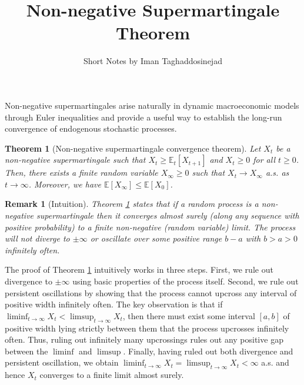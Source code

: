 \documentclass[12pt]{article}
\title{Non-negative Supermartingale Theorem}
\author{Short Notes by Iman Taghaddosinejad}
\newtheorem{theorem}{Theorem}
\newtheorem{remark}{Remark}
\begin{document}
\maketitle
Non-negative supermartingales arise naturally in dynamic macroeconomic models through 
Euler inequalities and provide a useful way to establish the long-run convergence of 
endogenous stochastic processes.

\begin{theorem}[Non-negative supermartingale convergence theorem]\label{thm:nonnegsupermartingale}
Let $X_t$ be a non-negative supermartingale such that $X_t\geq\mathbb{E}_t[X_{t+1}]$
and $X_t\geq0$ for all $t\geq0$. Then, there exists a finite random variable 
$X_\infty\geq0$ such that $X_t\to X_\infty$ a.s. as $t\to\infty$. Moreover, we have 
$\mathbb{E}[X_\infty]\leq \mathbb{E}[X_0]$.
\end{theorem}

\begin{remark}[Intuition]
Theorem \ref{thm:nonnegsupermartingale} states that if a random process is a 
non-negative supermartingale then it converges almost surely (along any sequence with positive
probability) to a finite non-negative (random variable) limit. The process will not diverge 
to $\pm\infty$ or oscillate over some positive range $b-a$ with $b>a>0$ infinitely 
often. 
\end{remark}
The proof of Theorem \ref{thm:nonnegsupermartingale} intuitively works in three steps. 
First, we rule out divergence to $\pm\infty$ using basic properties of the process itself. 
Second, we rule out persistent oscillations by showing that the process cannot upcross any 
interval of positive width infinitely often. The key observation is that if
$\liminf_{t\to\infty}X_t<\limsup_{t\to\infty}X_t$, then there must exist some interval 
$[a,b]$ of positive width lying strictly between them that the process upcrosses infinitely often. 
Thus, ruling out infinitely many upcrossings rules out any positive gap between the 
$\liminf$ and $\limsup$. Finally, having ruled out both divergence and persistent oscillation, 
we obtain $\liminf_{t\to\infty}X_t=\limsup_{t\to\infty}X_t <\infty$ a.s. and hence 
$X_t$ converges to a finite limit almost surely.
\end{document}
